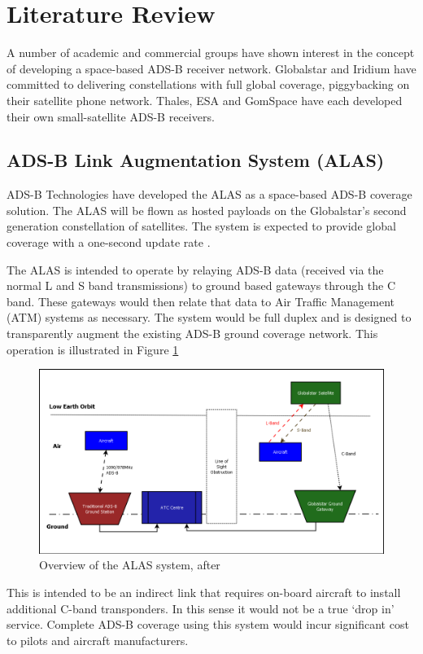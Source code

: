 \section{Literature Review}\label{sec:litreview}
A number of academic and commercial groups have shown interest in the concept of developing a space-based ADS-B receiver network. Globalstar and Iridium have committed to delivering constellations with full global coverage, piggybacking on their satellite phone network. Thales, ESA and GomSpace have each developed their own small-satellite ADS-B receivers.

\subsection{ADS-B Link Augmentation System (ALAS)}
ADS-B Technologies have developed the ALAS as a space-based ADS-B coverage solution. The ALAS will be flown as hosted payloads on the Globalstar's second generation constellation of satellites. The system is expected to provide global coverage with a one-second update rate \cite{ADS-B:Globalstar_webinar}.

The ALAS is intended to operate by relaying ADS-B data (received via the normal L and S band transmissions) to ground based gateways through the C band. These gateways would then relate that data to Air Traffic Management (ATM) systems as necessary. The system would be full duplex and is designed to transparently augment the existing ADS-B ground coverage network. This operation is illustrated in Figure \ref{fig:alas_overview}
\begin{figure}[htbp]
	\centering
	\includegraphics[scale = 0.40]{Pictures/alas_overview_tn.png}
	
	\caption[Overview of the ALAS system]{Overview of the ALAS system, after \cite{ADS-B:Globalstar_webinar}}
	\label{fig:alas_overview}
\end{figure}
This is intended to be an indirect link that requires on-board aircraft to install additional C-band transponders. In this sense it would not be a true `drop in' service. Complete ADS-B coverage using this system would incur significant cost to pilots and aircraft manufacturers.

